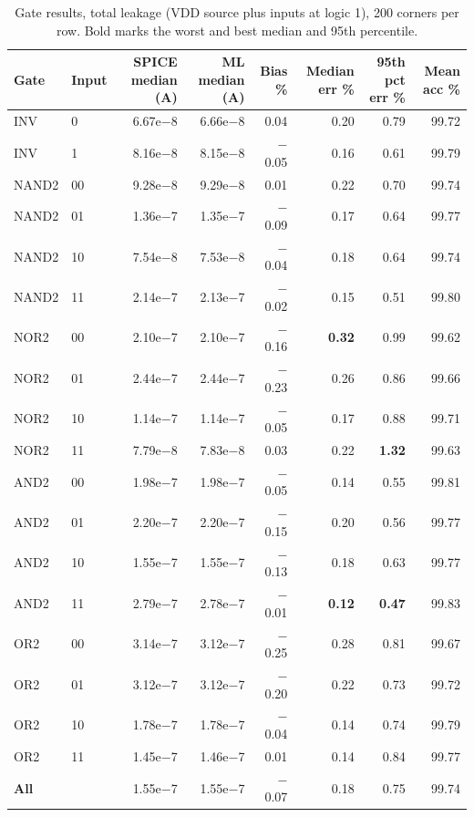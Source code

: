 \documentclass[10pt,a4paper]{article}
\newcommand{\best}[1]{\textbf{#1}}
\begin{document}
\begin{table}[H]
\centering\small
\begin{tabular}{@{}llrrrrrr@{}}
\toprule
Gate & Input & SPICE median (A) & ML median (A) & Bias \% & Median err \% & 95th pct err \% & Mean acc \%\\
\midrule
INV & 0 & 6.67e$-$8 & 6.66e$-$8 & 0.04 & 0.20 & 0.79 & 99.72\\
INV & 1 & 8.16e$-$8 & 8.15e$-$8 & $-$0.05 & 0.16 & 0.61 & 99.79\\
NAND2 & 00 & 9.28e$-$8 & 9.29e$-$8 & 0.01 & 0.22 & 0.70 & 99.74\\
NAND2 & 01 & 1.36e$-$7 & 1.35e$-$7 & $-$0.09 & 0.17 & 0.64 & 99.77\\
NAND2 & 10 & 7.54e$-$8 & 7.53e$-$8 & $-$0.04 & 0.18 & 0.64 & 99.74\\
NAND2 & 11 & 2.14e$-$7 & 2.13e$-$7 & $-$0.02 & 0.15 & 0.51 & 99.80\\
NOR2 & 00 & 2.10e$-$7 & 2.10e$-$7 & $-$0.16 & \best{0.32} & 0.99 & 99.62\\
NOR2 & 01 & 2.44e$-$7 & 2.44e$-$7 & $-$0.23 & 0.26 & 0.86 & 99.66\\
NOR2 & 10 & 1.14e$-$7 & 1.14e$-$7 & $-$0.05 & 0.17 & 0.88 & 99.71\\
NOR2 & 11 & 7.79e$-$8 & 7.83e$-$8 & 0.03 & 0.22 & \best{1.32} & 99.63\\
AND2 & 00 & 1.98e$-$7 & 1.98e$-$7 & $-$0.05 & 0.14 & 0.55 & 99.81\\
AND2 & 01 & 2.20e$-$7 & 2.20e$-$7 & $-$0.15 & 0.20 & 0.56 & 99.77\\
AND2 & 10 & 1.55e$-$7 & 1.55e$-$7 & $-$0.13 & 0.18 & 0.63 & 99.77\\
AND2 & 11 & 2.79e$-$7 & 2.78e$-$7 & $-$0.01 & \best{0.12} & \best{0.47} & 99.83\\
OR2 & 00 & 3.14e$-$7 & 3.12e$-$7 & $-$0.25 & 0.28 & 0.81 & 99.67\\
OR2 & 01 & 3.12e$-$7 & 3.12e$-$7 & $-$0.20 & 0.22 & 0.73 & 99.72\\
OR2 & 10 & 1.78e$-$7 & 1.78e$-$7 & $-$0.04 & 0.14 & 0.74 & 99.79\\
OR2 & 11 & 1.45e$-$7 & 1.46e$-$7 & 0.01 & 0.14 & 0.84 & 99.77\\
\midrule
\textbf{All} & & 1.55e$-$7 & 1.55e$-$7 & $-$0.07 & 0.18 & 0.75 & 99.74\\
\bottomrule
\end{tabular}
\caption{Gate results, total leakage (VDD source plus inputs at logic 1), 200 corners per row. Bold marks the worst and best median and 95th percentile.}\label{tab:gates}
\end{table}
\end{document}
